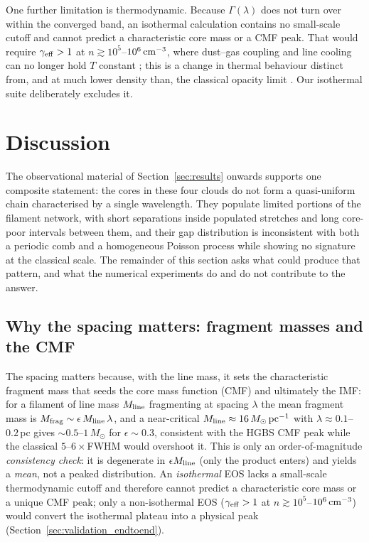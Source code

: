 \documentclass[usenatbib,twoside,twocolumn]{mnras}
\begin{document}
One further limitation is thermodynamic. Because $\Gamma(\lambda)$ does not turn over within the converged band, an isothermal calculation contains no small-scale cutoff and cannot predict a characteristic core mass or a CMF peak. That would require $\gamma_{\rm eff}>1$ at $n\gtrsim10^{5}$--$10^{6}\,{\rm cm^{-3}}$, where dust--gas coupling and line cooling can no longer hold $T$ constant \citep{Larson1985,Glover2012}; this is a change in thermal behaviour distinct from, and at much lower density than, the classical opacity limit \citep{Rees1976,LowLyndenBell1976}. Our isothermal suite deliberately excludes it.

\section{Discussion}

\noindent The observational material of Section~\ref{sec:results} onwards supports one composite statement: the cores in these four clouds do not form a quasi-uniform chain characterised by a single wavelength. They populate limited portions of the filament network, with short separations inside populated stretches and long core-poor intervals between them, and their gap distribution is inconsistent with both a periodic comb and a homogeneous Poisson process while showing no signature at the classical scale. The remainder of this section asks what could produce that pattern, and what the numerical experiments do and do not contribute to the answer.
\label{sec:discussion}

\subsection{Why the spacing matters: fragment masses and the CMF}
\label{sec:cmf}
The spacing matters because, with the line mass, it sets the characteristic fragment mass that seeds the core mass function (CMF) and ultimately the IMF: for a filament of line mass $M_{\rm line}$ fragmenting at spacing $\lambda$ the mean fragment mass is $M_{\rm frag}\sim\epsilon\,M_{\rm line}\,\lambda$, and a near-critical $M_{\rm line}\approx16\,M_\odot\,{\rm pc^{-1}}$ with $\lambda\approx0.1$--$0.2$\,pc gives $\sim0.5$--$1\,M_\odot$ for $\epsilon\sim0.3$, consistent with the HGBS CMF peak while the classical $5$--$6\times$FWHM would overshoot it. This is only an order-of-magnitude \emph{consistency check}: it is degenerate in $\epsilon M_{\rm line}$ (only the product enters) and yields a \emph{mean}, not a peaked distribution. An \emph{isothermal} EOS lacks a small-scale thermodynamic cutoff and therefore cannot predict a characteristic core mass or a unique CMF peak; only a non-isothermal EOS ($\gamma_{\rm eff}>1$ at $n\gtrsim10^{5}$--$10^{6}\,{\rm cm^{-3}}$) would convert the isothermal plateau into a physical peak (Section~\ref{sec:validation_endtoend}).
\end{document}
